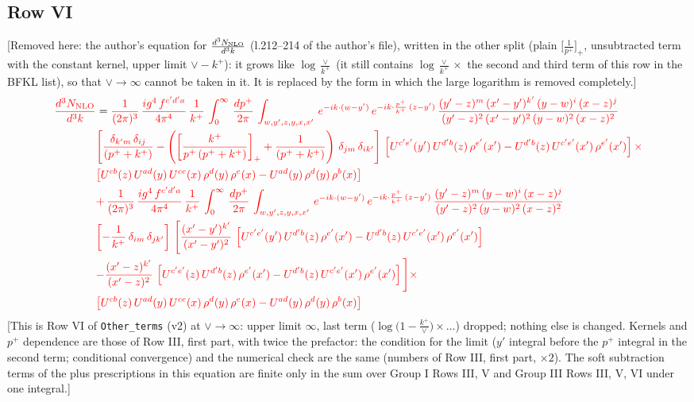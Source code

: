 \documentclass[9pt]{article}
\numberwithin{equation}{section}
\begin{document}
\subsection{Row VI}
{\color{orange}[Removed here: the author's equation for $\frac{d^{3}N_{\rm NLO}}{d^{3}k}$ (l.212--214 of the author's file), written in the other split (plain $\big[\frac{1}{p^{+}}\big]_{+}$, unsubtracted term with the constant kernel, upper limit $\vee-k^{+}$): it grows like $\log\frac{\vee}{k^{+}}$ (it still contains $\log\frac{\vee}{k^{+}}\times$ the second and third term of this row in the BFKL list), so that $\vee\to\infty$ cannot be taken in it. It is replaced by the form in which the large logarithm is removed completely.]}
\begin{align}
    {\color{red}\frac{d^{3}N_{\rm NLO}}{d^{3}k}} & = {\color{red}\frac{1}{(2\pi)^{3}}\, \frac{ig^{4}\,f^{c'd'a}}{4\pi^{4}}\, \frac{1}{k^{+}}\,\int_{0}^{\infty}\, \frac{dp^{+}}{2\pi}\, \int_{w,y',z,y,x,x'}\, e^{-ik\cdot (w-y')}\, e^{-ik\cdot \frac{p^{+}}{k^{+}}\,(z-y')}\,\frac{(y'-z)^{m}\,(x'-y')^{k'}\,(y-w)^{i}\,(x-z)^{j}}{(y'-z)^{2}\,(x'-y')^{2}\,(y-w)^{2}\,(x-z)^{2}}}\notag \\ & {\color{red}\left[\frac{\delta_{k'm}\,\delta_{ij}}{(p^{+}+k^{+})}-\left(\left[\frac{k^{+}}{p^{+}\,(p^{+}+k^{+})}\right]_{+}+\frac{1}{(p^{+}+k^{+})}\right)\,\delta_{jm}\,\delta_{ik'}\right]\, \left[U^{c'e'}(y')\,U^{d'b}(z)\,\rho^{e'}(x')-U^{d'b}(z)\,U^{c'e'}(x')\,\rho^{e'}(x')\right]\times}\notag \\ &  {\color{red}\left[U^{cb}(z)\,U^{ad}(y)\,U^{ce}(x)\,\rho^{d}(y)\,\rho^{e}(x)-U^{ad}(y)\,\rho^{d}(y)\,\rho^{b}(x)\right]} \notag \\ &  {\color{red}+\,\frac{1}{(2\pi)^{3}}\, \frac{ig^{4}\,f^{c'd'a}}{4\pi^{4}}\, \frac{1}{k^{+}}\,\int_{0}^{\infty}\, \frac{dp^{+}}{2\pi}\, \int_{w,y',z,y,x,x'}\, e^{-ik\cdot (w-y')}\, e^{-ik\cdot \frac{p^{+}}{k^{+}}\,(z-y')}\,\frac{(y'-z)^{m}\,(y-w)^{i}\,(x-z)^{j}}{(y'-z)^{2}\,(y-w)^{2}\,(x-z)^{2}}}\notag \\ &  {\color{red}\left[-\frac{1}{k^{+}}\, \delta_{im}\, \delta_{jk'}\right]\, \Bigg[\frac{(x'-y')^{k'}}{(x'-y')^{2}}\,\left[U^{c'e'}(y')\,U^{d'b}(z)\,\rho^{e'}(x')-U^{d'b}(z)\,U^{c'e'}(x')\,\rho^{e'}(x')\right]}\notag \\ & {\color{red}-\frac{(x'-z)^{k'}}{(x'-z)^{2}}\,\left[U^{c'e'}(z)\,U^{d'b}(z)\,\rho^{e'}(x')-U^{d'b}(z)\,U^{c'e'}(x')\,\rho^{e'}(x')\right]\Bigg]\times}\notag \\ &    {\color{red}\left[U^{cb}(z)\,U^{ad}(y)\,U^{ce}(x)\,\rho^{d}(y)\,\rho^{e}(x)-U^{ad}(y)\,\rho^{d}(y)\,\rho^{b}(x)\right]}
\end{align}
{\color{red}[This is Row VI of \texttt{Other\_terms} (v2) at $\vee\to\infty$: upper limit $\infty$, last term ($\log\big(1-\frac{k^{+}}{\vee}\big)\times\dots$) dropped; nothing else is changed. Kernels and $p^{+}$ dependence are those of Row III, first part, with twice the prefactor: the condition for the limit ($y'$ integral before the $p^{+}$ integral in the second term; conditional convergence) and the numerical check are the same (numbers of Row III, first part, $\times2$). The soft subtraction terms of the plus prescriptions in this equation are finite only in the sum over Group I Rows III, V and Group III Rows III, V, VI under one integral.]}
\end{document}
